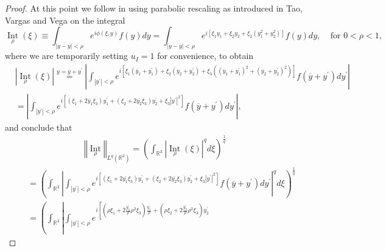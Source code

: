 \documentclass{amsart}%
\theoremstyle{plain}
\numberwithin{equation}{section}
\begin{document}
\begin{proof}
At this point we follow \cite{BoGu} in using parabolic rescaling as introduced
in Tao, Vargas and Vega \cite{TaVaVe} on the integral
\[
\operatorname*{Int}_{\rho}\left(  \xi\right)  \equiv\int_{\left\vert
y-\overline{y}\right\vert <\rho}e^{i\phi\left(  \xi,y\right)  }f\left(
y\right)  dy=\int_{\left\vert y-\overline{y}\right\vert <\rho}e^{i\left[
\xi_{1}y_{1}+\xi_{2}y_{2}+\xi_{2}\left(  y_{1}^{2}+y_{2}^{2}\right)  \right]
}f\left(  y\right)  dy,\ \ \ \ \ \text{for }0<\rho<1,
\]
where we are temporarily setting $u_{I}=1$ for convenience, to obtain%
\begin{align*}
&  \left\vert \operatorname*{Int}_{\rho}\left(  \xi\right)  \right\vert
\overset{y=\overline{y}+y^{\prime}}{=}\left\vert \int_{\left\vert y^{\prime
}\right\vert <\rho}e^{i\left[  \xi_{1}\left(  \overline{y}_{1}+y_{1}^{\prime
}\right)  +\xi_{2}\left(  \overline{y}_{2}+y_{2}^{\prime}\right)  +\xi
_{3}\left(  \left(  \overline{y}_{1}+y_{1}^{\prime}\right)  ^{2}+\left(
\overline{y}_{2}+y_{2}^{\prime}\right)  ^{2}\right)  \right]  }f\left(
\overline{y}+y^{\prime}\right)  dy^{\prime}\right\vert \\
&  =\left\vert \int_{\left\vert y^{\prime}\right\vert <\rho}e^{i\left[
\left(  \xi_{1}+2\overline{y_{1}}\xi_{3}\right)  y_{1}^{\prime}+\left(
\xi_{2}+2\overline{y_{2}}\xi_{3}\right)  y_{2}^{\prime}+\xi_{3}\left\vert
y^{\prime}\right\vert ^{2}\right]  }f\left(  \overline{y}+y^{\prime}\right)
dy^{\prime}\right\vert ,
\end{align*}
and conclude that%
\begin{align*}
&  \ \ \ \ \ \ \ \ \ \ \ \ \ \ \ \ \ \ \ \ \ \ \ \ \ \ \ \ \ \ \left\Vert
\operatorname*{Int}_{\rho}\right\Vert _{L^{q}\left(  \mathbb{R}^{3}\right)
}=\left(  \int_{\mathbb{R}^{3}}\left\vert \operatorname*{Int}_{\rho}\left(
\xi\right)  \right\vert ^{q}d\xi\right)  ^{\frac{1}{q}}\\
&  =\left(  \int_{\mathbb{R}^{3}}\left\vert \int_{\left\vert y^{\prime
}\right\vert <\rho}e^{i\left[  \left(  \xi_{1}+2\overline{y_{1}}\xi
_{3}\right)  y_{1}^{\prime}+\left(  \xi_{2}+2\overline{y_{2}}\xi_{3}\right)
y_{2}^{\prime}+\xi_{3}\left\vert y^{\prime}\right\vert ^{2}\right]  }f\left(
\overline{y}+y^{\prime}\right)  dy^{\prime}\right\vert ^{q}d\xi\right)
^{\frac{1}{q}}\\
&  =\left(  \int_{\mathbb{R}^{3}}\left\vert \int_{\left\vert y^{\prime
}\right\vert <\rho}e^{i\left[  \left(  \rho\xi_{1}+2\overline{\frac{y_{1}%
}{\rho}}\rho^{2}\xi_{3}\right)  \frac{y_{1}^{\prime}}{\rho}+\left(  \rho
\xi_{2}+2\overline{\frac{y_{2}}{\rho}}\rho^{2}\xi_{3}\right)  y_{2}^{\prime
}}
\end{align*}
\end{proof}
\end{document}
